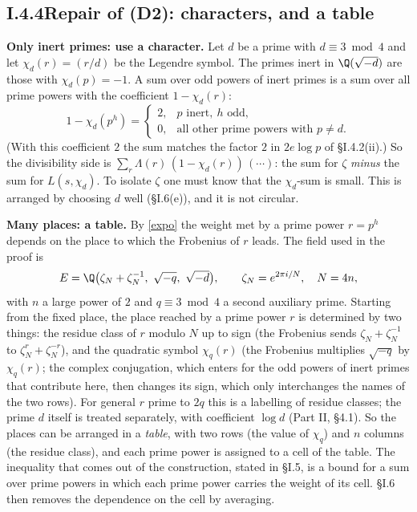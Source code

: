 \documentclass[11pt,letterpaper]{article}
\begin{document}
\subsection*{I.4.4\quad Repair of (D2): characters, and a table}

\textbf{Only inert primes: use a character.} Let $d$ be a prime with $d\equiv3\bmod4$ and let
$\chi_d(r)=(r/d)$ be the Legendre symbol. The primes inert in $\Q(\sqrt{-d})$ are those with
$\chi_d(p)=-1$. A sum over odd powers of inert primes is a sum over all prime powers with the coefficient
$1-\chi_d(r)$:
\begin{equation}\label{D:22}
 1-\chi_d(p^h)=\begin{cases}2,& p \text{ inert},\ h\text{ odd},\\ 0,&\text{all other prime powers with } p\ne d.\end{cases}
\end{equation}
(With this coefficient $2$ the sum matches the factor $2$ in $2e\log p$ of \S I.4.2(ii).) So the divisibility side is
$\sum_r\Lambda(r)\,(1-\chi_d(r))\,(\cdots)$: the sum for $\zeta$ \emph{minus} the sum for $L(s,\chi_d)$. To
isolate $\zeta$ one must know that the $\chi_d$-sum is small. This is arranged by choosing $d$ well
(\S I.6(e)), and it is not circular.

\textbf{Many places: a table.} By \eqref{expo} the weight met by a prime power $r=p^h$ depends on the place
to which the Frobenius of $r$ leads. The field used in the proof is
\begin{equation}\label{D:23}
 E=\Q\big(\zeta_N+\zeta_N^{-1},\ \sqrt{-q},\ \sqrt{-d}\big),\qquad \zeta_N=e^{2\pi i/N},\quad N=4n,
\end{equation}
with $n$ a large power of $2$ and $q\equiv3\bmod4$ a second auxiliary prime. Starting from the fixed place, the place reached by a prime power $r$ is determined by
two things: the residue class of $r$ modulo $N$ up to sign (the Frobenius sends $\zeta_N+\zeta_N^{-1}$ to
$\zeta_N^r+\zeta_N^{-r}$), and the quadratic symbol $\chi_q(r)$ (the Frobenius multiplies $\sqrt{-q}$ by $\chi_q(r)$; the complex conjugation, which enters for the odd powers of inert primes that contribute here, then changes its sign, which only interchanges the names of the two rows). For general $r$ prime to $2q$ this is a labelling of residue classes; the prime $d$ itself is treated separately, with coefficient $\log d$ (Part II, \S4.1). So the places can be arranged in a \emph{table}, with two rows (the value of $\chi_q$) and
$n$ columns (the residue class), and each prime power is assigned to a cell of the table. The inequality
that comes out of the construction, stated in \S I.5, is a bound for a sum over prime powers in which each
prime power carries the weight of its cell. \S I.6 then removes the dependence on the cell by averaging.
\end{document}
